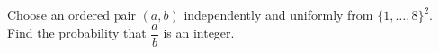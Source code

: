 Choose an ordered pair $(a,b)$ independently and uniformly from $\{1,\ldots,8\}^2$. Find the probability that $\dfrac{a}{b}$ is an integer.
